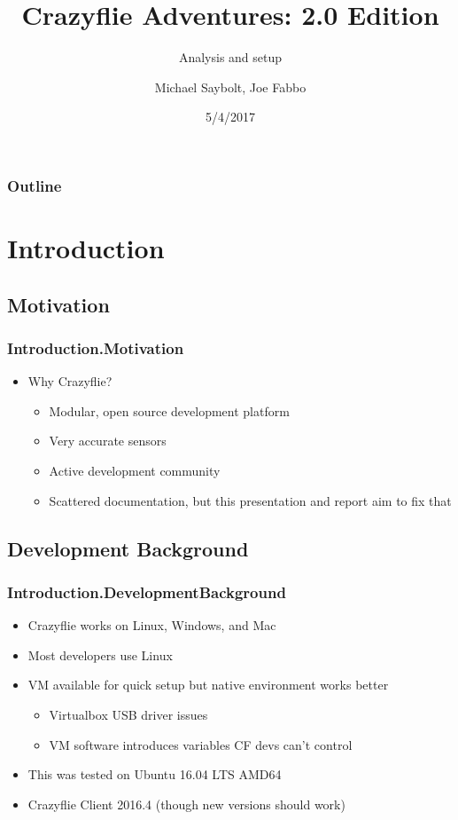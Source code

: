 \documentclass[t, xcolor=dvipsnames]{beamer} %
\begin{document}
\begin{frame}
\title{Crazyflie Adventures: 2.0 Edition}
\subtitle{Analysis and setup}
\author{Michael Saybolt, Joe Fabbo}
\date{5/4/2017}
\titlepage
\end{frame}

\begin{frame}
	\frametitle{Outline}
	\tableofcontents
\end{frame}

\section{Introduction}
\subsection{Motivation}
\begin{frame}
	\frametitle{Introduction.Motivation}
	\begin{itemize}
		\item{Why Crazyflie?}
		\begin{itemize}
			\item Modular, open source development platform
			\item Very accurate sensors
			\item Active development community
			\item Scattered documentation, but this presentation and report aim to fix that
		\end{itemize}
	\end{itemize} %
\end{frame}

\subsection{Development Background}
\begin{frame} %
	\frametitle{Introduction.DevelopmentBackground}
	\begin{itemize}
		\item{Crazyflie works on Linux, Windows, and Mac}
		\item{Most developers use Linux}
		\item VM available for quick setup but native environment works better
			\begin{itemize}
				\item Virtualbox USB driver issues
				\item VM software introduces variables CF devs can't control
			\end{itemize}
		\item{This was tested on Ubuntu 16.04 LTS AMD64}
		\item Crazyflie Client 2016.4 (though new versions should work)
	\end{itemize}
\end{frame}
\end{document}
